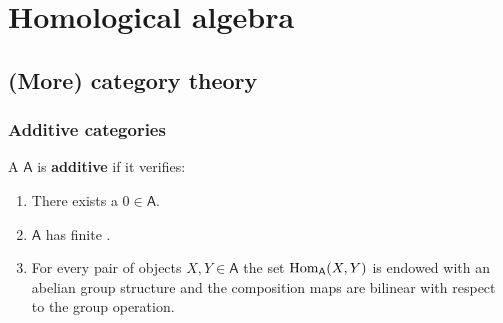 \documentclass[../main.tex]{subfiles}
\begin{document}
\chapter{Homological algebra}

\section{(More) category theory}
\subsection{Additive categories}
\begin{definition} \label{def:additive-category}
  A  \(\mathsf{A}\) is \textbf{additive} if it verifies:
  \begin{enumerate}[label=A.\arabic*), ref=A.\arabic*]
    \item\label{axiom:additive-zero} There exists a  \(0 \in \mathsf{A}\).
    \item\label{axiom:additive-products} \(\mathsf{A}\) has finite .
    \item\label{axiom:additive-hom} For every pair of objects \(X, Y \in \mathsf{A}\) the set \(\operatorname{Hom}_{\mathsf{A}}(X, Y)\) is endowed with an abelian group structure and the composition maps are bilinear with respect to the group operation.
  \end{enumerate}
\end{definition}
\end{document}
